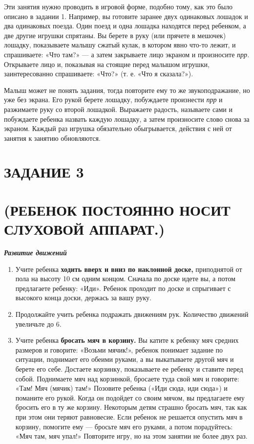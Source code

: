 \documentclass{book}
\renewcommand{\emph}[1]{\textit{#1}}
\begin{document}
Эти занятия нужно проводить в игровой форме, подобно тому, как это было
описано в задании 1. Например, вы готовите заранее двух одинаковых
лошадок и два одинаковых поезда. Один поезд и одна лошадка находятся
перед ребенком, а две другие игрушки спрятаны. Вы берете в руку (или
прячете в мешочек) лошадку, показываете малышу сжатый кулак, в котором
явно что-то лежит, и спрашиваете: «Что там?» --- а затем закрываете лицо
экраном и произносите \emph{прр.} Открываете лицо и, показывая на
стоящие перед малышом игрушки, заинтересованно спрашиваете: «Что?» (т.
е. «Что я сказала?»).

Малыш может не понять задания, тогда повторите ему то же
звукоподражание, но уже без экрана. Его рукой берете лошадку, побуждаете
произнести \emph{прр} и разжимаете руку со второй лошадкой. Выражаете
радость, называете сами и побуждаете ребенка назвать каждую лошадку, а
затем произносите слово снова за экраном. Каждый раз игрушка обязательно
обыгрывается, действия с ней от занятия к занятию обновляются.

\section{ЗАДАНИЕ 3}\section*{(РЕБЕНОК ПОСТОЯННО НОСИТ СЛУХОВОЙ АППАРАТ.)}

\textbf{\emph{Развитие движений}}

\begin{enumerate}
\def\labelenumi{\arabic{enumi}.}
\item Учите ребенка \textbf{ходить вверх и вниз по наклонной доске,}
приподнятой от пола на высоту 10 см одним концом. Сначала по доске идете
вы, а потом предлагаете ребенку: «Иди». Ребенок проходит по доске и
спрыгивает с высокого конца доски, держась за вашу руку.


\item
  
  Продолжайте учить ребенка подражать движениям рук. Количество движений
  увеличьте до 6.
  
\item
  
  Учите ребенка \textbf{бросать мяч в корзину.} Вы катите к ребенку мяч
  средних размеров и говорите: «Возьми мячик!», ребенок понимает задание
  по ситуации, поднимает его обеими руками, а вы выкатываете другой мяч
  и берете его себе. Достаете корзинку, показываете ее ребенку и ставите
  перед собой. Поднимаете мяч над корзинкой, бросаете туда свой мяч и
  говорите: «Там! Мяч (мячик) там!» Позовите ребенка («Иди сюда, иди
  сюда») и поманите его рукой. Когда он подойдет со своим мячом, вы
  предлагаете ему бросить его в ту же корзину. Некоторым детям страшно
  бросать мяч, так как при этом они теряют равновесие. Если ребенок не
  решается опустить мяч в корзину, помогите ему --- бросьте мяч его
  руками, а потом порадуйтесь: «Мяч там, мяч упал!» Повторите игру, но
  на этом занятии не более двух раз.
  
\end{enumerate}
\end{document}
